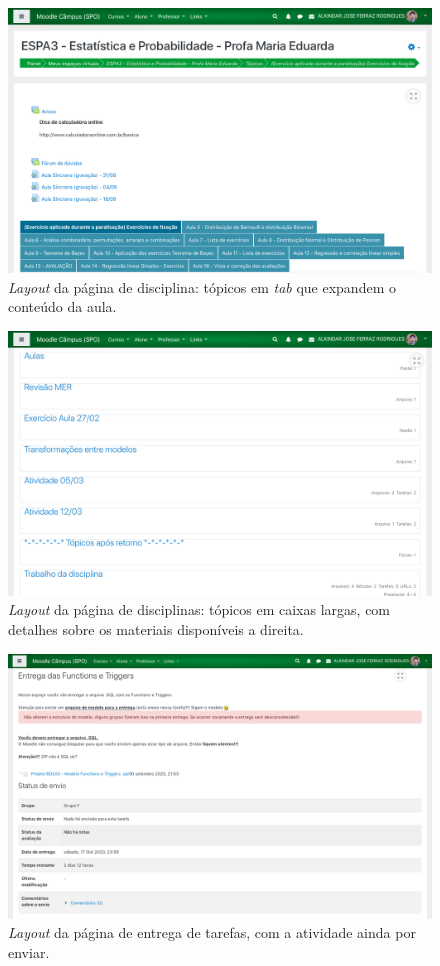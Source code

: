 \documentclass[11pt]{article}
\begin{document}
\begin{figure}[htbp]
\centering
\includegraphics[width=.9\linewidth]{./media/disc_2.png}
\caption[\emph{tab}]{\label{fig:org1103064}\emph{Layout} da página de disciplina: tópicos em \emph{tab} que expandem o conteúdo da aula.}
\end{figure}
\begin{figure}[htbp]
\centering
\includegraphics[width=.9\linewidth]{./media/disc_3.png}
\caption[\emph{Layout}]{\label{fig:org64d1f32}\emph{Layout} da página de disciplinas: tópicos em caixas largas, com detalhes sobre os materiais disponíveis a direita.}
\end{figure}
\begin{figure}[htbp]
\centering
\includegraphics[width=.9\linewidth]{./media/entrega_1.png}
\caption[\emph{Layout}]{\label{fig:org1f2a93f}\emph{Layout} da página de entrega de tarefas, com a atividade ainda por enviar.}
\end{figure}
\end{document}
